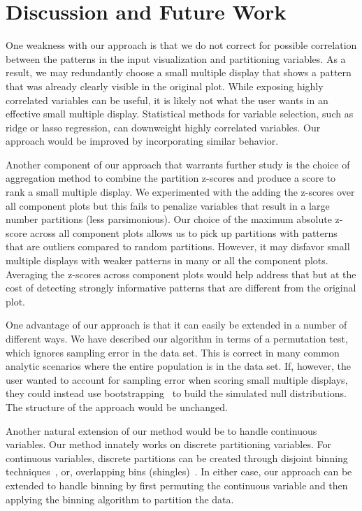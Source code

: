 \section{Discussion and Future Work}
\label{sec:discussion}
One weakness with our approach is that we do not correct for possible correlation between the patterns in the input visualization and partitioning variables. As a result, we may redundantly choose a small multiple display that shows a pattern that was already clearly visible in the original plot. While exposing highly correlated variables can be useful, it is likely not what the user wants in an effective small multiple display. Statistical methods for variable selection, such as ridge or lasso regression, can downweight highly correlated variables. Our approach would be improved by incorporating similar behavior. 

Another component of our approach that warrants further study is the choice of aggregation method to combine the partition z-scores and produce a score to rank a small multiple display. We experimented with the adding the z-scores over all component plots but this fails to penalize variables that result in a large number partitions (less parsimonious). Our choice of the maximum absolute z-score across all component plots allows us to pick up partitions with patterns that are outliers compared to random partitions. However, it may disfavor small multiple displays with weaker patterns in many or all the component plots. Averaging the z-scores across component plots would help address that but at the cost of detecting strongly informative patterns that are different from the original plot. 

One advantage of our approach is that it can easily be extended in a number of different ways. We have described our algorithm in terms of a permutation test, which ignores sampling error in the data set. This is correct in many common analytic scenarios where the entire population is in the data set. If, however, the user wanted to account for sampling error when scoring small multiple displays, they could instead use bootstrapping~\cite{Efron1994} to build the simulated null distributions. The structure of the approach would be unchanged.

Another natural extension of our method would be to handle continuous variables. Our method innately works on discrete partitioning variables. For continuous variables, discrete partitions can be created through disjoint binning techniques~\cite{Freedman1981,Scott2009}, or, overlapping bins (shingles)~\cite{Becker1996}. In either case, our approach can be extended to handle binning by first permuting the continuous variable and then applying the binning algorithm to partition the data.

